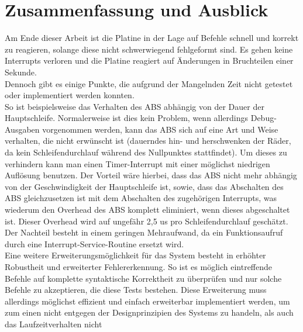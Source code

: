 \chapter{Zusammenfassung und Ausblick}
Am Ende dieser Arbeit ist die Platine in der Lage auf Befehle schnell und korrekt zu reagieren,
solange diese nicht schwerwiegend fehlgeformt sind. Es gehen keine Interrupts verloren und die
Platine reagiert auf Änderungen in Bruchteilen einer Sekunde.\\
Dennoch gibt es einige Punkte, die aufgrund der Mangelnden Zeit nicht getestet oder implementiert
werden konnten.\\
So ist beispielsweise das Verhalten des ABS abhängig von der Dauer der Hauptschleife. Normalerweise
ist dies kein Problem, wenn allerdings Debug-Ausgaben vorgenommen werden, kann das ABS sich
auf eine Art und Weise verhalten, die nicht erwünscht ist (dauerndes hin- und herschwenken der Räder,
da kein Schleifendurchlauf während des Nullpunktes stattfindet). Um dieses zu verhindern kann man
einen Timer-Interrupt mit einer möglichst niedrigen Auflösung benutzen. Der Vorteil wäre hierbei,
dass das ABS nicht mehr abhängig von der Geschwindigkeit der Hauptschleife ist, sowie, dass das
Abschalten des ABS gleichzusetzen ist mit dem Abschalten des zugehörigen Interrupts, was wiederum
den Overhead des ABS komplett eliminiert, wenn dieses abgeschaltet ist. Dieser Overhead wird auf
ungefähr 2,5 us pro Schleifendurchlauf geschätzt. Der Nachteil besteht in einem geringen
Mehraufwand, da ein Funktionsaufruf durch eine Interrupt-Service-Routine ersetzt wird.\\
Eine weitere Erweiterungsmöglichkeit für das System besteht in erhöhter Robustheit und erweiterter
Fehlererkennung. So ist es möglich eintreffende Befehle auf komplette syntaktische Korrektheit
zu überprüfen und nur solche Befehle zu akzeptieren, die diese Tests bestehen. Diese Erweiterung
muss allerdings möglichst effizient und einfach erweiterbar implementiert werden, um zum einen nicht
entgegen der Designprinzipien des Systems zu handeln, als auch das Laufzeitverhalten nicht
